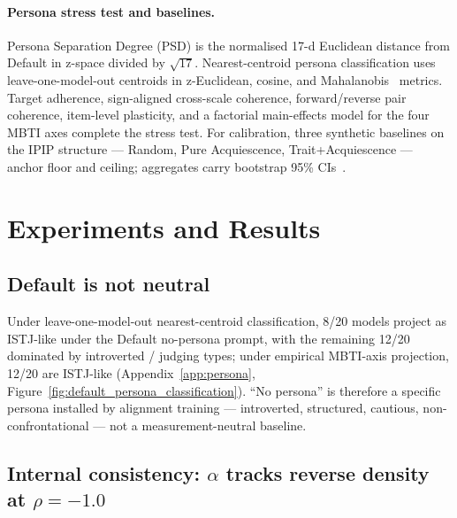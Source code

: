 \documentclass[11pt]{article}
\begin{document}
\paragraph{Persona stress test and baselines.} Persona Separation Degree (PSD) is the normalised 17-d Euclidean distance from Default in z-space divided by $\sqrt{17}$. Nearest-centroid persona classification uses leave-one-model-out centroids in z-Euclidean, cosine, and Mahalanobis~\citep{mahalanobis1936generalised} metrics. Target adherence, sign-aligned cross-scale coherence, forward/reverse pair coherence, item-level plasticity, and a factorial main-effects model for the four MBTI axes complete the stress test. For calibration, three synthetic baselines on the IPIP structure --- Random, Pure Acquiescence, Trait+Acquiescence --- anchor floor and ceiling; aggregates carry bootstrap 95\% CIs~\citep{efron1979bootstrap}.


\section{Experiments and Results}
\label{sec:results}

\subsection{Default is not neutral}
\label{sec:results-default}

Under leave-one-model-out nearest-centroid classification, 8/20 models project as ISTJ-like under the Default no-persona prompt, with the remaining 12/20 dominated by introverted / judging types; under empirical MBTI-axis projection, 12/20 are ISTJ-like (Appendix~\ref{app:persona}, Figure~\ref{fig:default_persona_classification}). ``No persona'' is therefore a specific persona installed by alignment training --- introverted, structured, cautious, non-confrontational --- not a measurement-neutral baseline.

\subsection{Internal consistency: $\alpha$ tracks reverse density at $\rho = -1.0$}
\label{sec:results-alpha}
\end{document}
